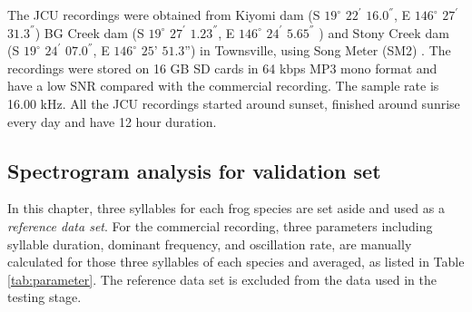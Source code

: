 The JCU recordings were obtained from Kiyomi dam (S $19^{\circ}$ $22^{'}$ $16.0^{''}$, E $146^{\circ}$ $27^{'}$ $31.3^{''}$)  BG Creek dam (S $19^{\circ}$ $27^{'}$ $1.23^{''}$, E $146^{\circ}$ $24^{'}$ $5.65^{''}$ ) and Stony Creek dam (S $19^{\circ}$ $24^{'}$ $07.0^{''}$, E $146^{\circ}$ $25’$ $51.3”$) in Townsville, using Song Meter (SM2) \citep{songMeter}. The recordings were stored on 16 GB SD cards in 64 kbps MP3 mono format and have a low SNR compared with the commercial recording. The sample rate is 16.00 kHz.
All the JCU recordings started around sunset, finished around sunrise every day and have 12 hour duration. 






\subsection{Spectrogram analysis for validation set}
In this chapter, three syllables for each frog species are set aside and used as a \textit{reference data set}. For the commercial recording, three parameters including syllable duration, dominant frequency, and oscillation rate, are manually calculated for those three syllables of each species and averaged, as listed in Table \ref{tab:parameter}. The reference data set is excluded from the data used in the testing stage. 

